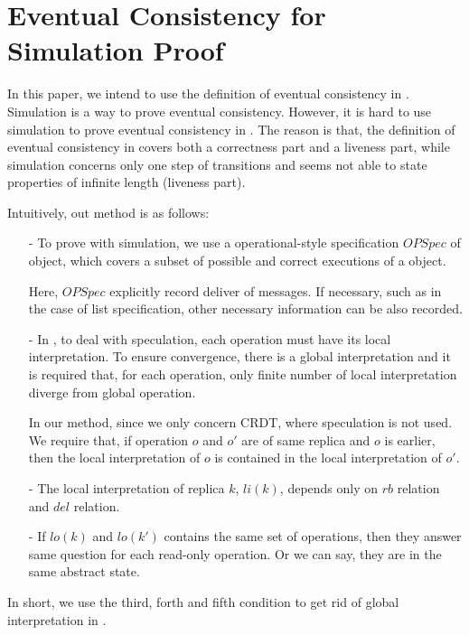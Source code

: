 
\section{Eventual Consistency for Simulation Proof}
\label{sec:eventual consistency for simulation proof} 

In this paper, we intend to use the definition of eventual consistency in \cite{Bouajjani:2014}. Simulation is a way to prove eventual consistency. However, it is hard to use simulation to prove eventual consistency in \cite{Bouajjani:2014}. The reason is that, the definition of eventual consistency in \cite{Bouajjani:2014} covers both a correctness part and a liveness part, while simulation concerns only one step of transitions and seems not able to state properties of infinite length (liveness part).

Intuitively, out method is as follows: 

\begin{itemize}
\setlength{\itemsep}{0.5pt}
\item[-] To prove with simulation, we use a operational-style specification $\textit{OPSpec}$ of object, which covers a subset of possible and correct executions of a object. 

Here, $\textit{OPSpec}$ explicitly record deliver of messages. If necessary, such as in the case of list specification, other necessary information can be also recorded. 

\item[-] In \cite{Bouajjani:2014}, to deal with speculation, each operation must have its local interpretation. To ensure convergence, there is a global interpretation and it is required that, for each operation, only finite number of local interpretation diverge from global operation.
    
    In our method, since we only concern CRDT, where speculation is not used. We require that, if operation $o$ and $o'$ are of same replica and $o$ is earlier, then the local interpretation of $o$ is contained in the local interpretation of $o'$.

\item[-] The local interpretation of replica $k$, $li(k)$, depends only on $rb$ relation and $del$ relation. 

\item[-] If $lo(k)$ and $lo(k')$ contains the same set of operations, then they answer same question for each read-only operation. Or we can say, they are in the same abstract state. 
\end{itemize} 

In short, we use the third, forth and fifth condition to get rid of global interpretation in \cite{Bouajjani:2014}. 



